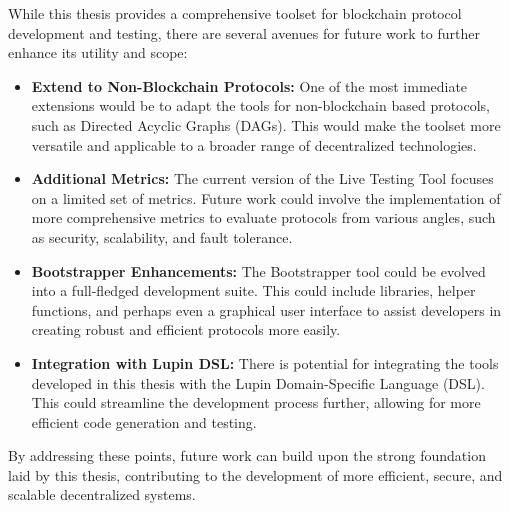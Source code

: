 While this thesis provides a comprehensive toolset for blockchain protocol development and testing, there are several avenues for future work to further enhance its utility and scope:

\begin{itemize}
    \item \textbf{Extend to Non-Blockchain Protocols:} One of the most immediate extensions would be to adapt the tools for non-blockchain based protocols, such as Directed Acyclic Graphs (DAGs). This would make the toolset more versatile and applicable to a broader range of decentralized technologies.
    
    \item \textbf{Additional Metrics:} The current version of the Live Testing Tool focuses on a limited set of metrics. Future work could involve the implementation of more comprehensive metrics to evaluate protocols from various angles, such as security, scalability, and fault tolerance.
    
    \item \textbf{Bootstrapper Enhancements:} The Bootstrapper tool could be evolved into a full-fledged development suite. This could include libraries, helper functions, and perhaps even a graphical user interface to assist developers in creating robust and efficient protocols more easily.
    
    \item \textbf{Integration with Lupin DSL:} There is potential for integrating the tools developed in this thesis with the Lupin Domain-Specific Language (DSL). This could streamline the development process further, allowing for more efficient code generation and testing.
\end{itemize}

By addressing these points, future work can build upon the strong foundation laid by this thesis, contributing to the development of more efficient, secure, and scalable decentralized systems.
